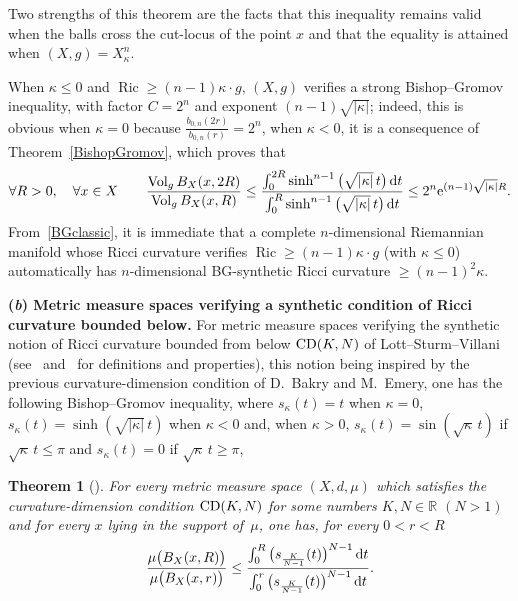 \documentclass[pdftex]{sigma}
\numberwithin{equation}{section}
\newtheorem{theor}{Theorem}[section]
\newcommand{\R}{\mathbb{R}}
\newcommand{\Vol}{\operatorname{Vol}}
\newcommand{\Ric}{\operatorname{Ric}}
\begin{document}
Two strengths of this theorem are the facts that this inequality remains valid when the balls cross the cut-locus of the point $x$ and that the equality is
attained when $(X,g) = X_{\kappa}^n$.

When $\kappa \le 0$ and $\Ric \ge (n-1) \kappa \cdot g $, $(X,g)$ verifies a strong Bishop--Gromov inequality, with factor $C = 2^n$ and exponent $(n-1) \sqrt{|\kappa|}$; indeed, this is obvious when $\kappa = 0$ because $\frac{b_{0, n} (2 r)}{b_{ 0, n} ( r)} = 2^n$,
when $\kappa < 0$, it is a consequence of Theorem~\ref{BishopGromov}, which proves that
\begin{gather}\label{BGclassic}
\forall R>0, \quad \forall x \in X \qquad\dfrac{\Vol_g B_X(x, 2 R)}{\Vol_g B_X(x, R)} \le \dfrac{\int_0^{2 R} \sinh ^{n-1} \big(\sqrt {|\kappa|}\, t\big)\, {\rm d}t}{\int_0^R \sinh ^{n-1} \big(\sqrt {|\kappa|}\, t\big)\, {\rm d}t} \le 2^n {\rm e}^{(n-1) \sqrt{|\kappa|} R}.
\end{gather}
From~\eqref{BGclassic}, it is immediate that a complete $n$-dimensional
Riemannian manifold whose Ricci curvature verifies $\Ric \ge (n-1) \kappa \cdot g $
(with $\kappa \le 0$) automatically has $n$-dimensional BG-synthetic Ricci curvature $\ge (n-1)^2 \kappa$.

\medskip\noindent
{\bf (\emph{b}) Metric measure spaces verifying a synthetic condition of Ricci curvature boun\-ded below.}
For metric measure spaces verifying the synthetic notion of Ricci curvature bounded from below ${\rm CD}(K,N)$ of Lott--Sturm--Villani (see~\cite{LV} and~\cite{St}
for definitions and properties), this notion being inspired by the previous curvature-dimension condition of D.~Bakry and M.~Emery, one has the following Bishop--Gromov inequality, where $s_{\kappa} (t) = t$ when $\kappa = 0$, $s_{\kappa} (t) = \sinh (\sqrt{|\kappa|}\, t)$ when $\kappa < 0$ and, when $\kappa > 0$, $s_ {\kappa} (t) = \sin (\sqrt{\kappa}\, t)
$ if $\sqrt{\kappa}\, t \le \pi$ and $s_{\kappa} (t) = 0$ if $\sqrt{\kappa}\, t \ge \pi$,

\begin{theor}[{\cite[Theorem~2.3]{St}}]\label{Bishopsynth}
For every metric measure space $(X,d,\mu)$ which satisfies the curvature-dimension
condition ${\rm CD}(K,N)$ for some numbers $K, N \in \R$ $(N > 1)$ and for every $x$ lying in the support of~$\mu$, one has, for every $0 < r < R$
\begin{gather*}
\dfrac{\mu \big(B_X(x, R)\big)}{\mu \big(B_X(x, r)\big)} \le \dfrac{\int_0^{R} \big(s_{\frac{K}{N-1}} (t)\big)^{N-1}\, {\rm d}t}{\int_0^{r} \big(s_{\frac{K}{N-1}} (t)\big)^{N-1}\, {\rm d}t}.
\end{gather*}
\end{theor}
\end{document}
